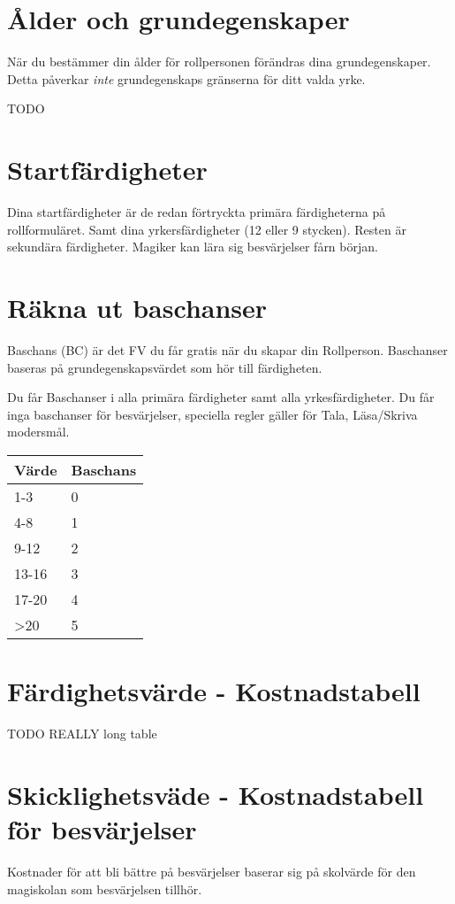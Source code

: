 \documentclass[a4paper, 10pt, titlepage]{article}
\begin{document}
\section{Ålder och grundegenskaper}

När du bestämmer din ålder för rollpersonen förändras dina grundegenskaper. Detta
påverkar \textit{inte}  grundegenskaps gränserna för ditt valda yrke.

TODO

\section{Startfärdigheter}
Dina startfärdigheter är de redan förtryckta primära färdigheterna på rollformuläret.
Samt dina yrkersfärdigheter (12 eller 9 stycken). Resten är sekundära färdigheter.
Magiker kan lära sig besvärjelser fårn början.

\section{Räkna ut baschanser}
Baschans (BC) är det FV du får gratis när du skapar din Rollperson. Baschanser baseras
på grundegenskapsvärdet som hör till färdigheten.

Du får Baschanser i alla primära färdigheter samt alla yrkesfärdigheter.
Du får inga baschanser för besvärjelser, speciella regler gäller för Tala,
Läsa/Skriva modersmål.

\begin{table}[hbp]
  \begin{tabular}{|l|l|}
    \hline
    Värde & Baschans \\
    \hline
    1-3   & 0 \\
    \hline
    4-8   & 1 \\
    \hline
    9-12  & 2 \\
    \hline
    13-16 & 3 \\
    \hline
    17-20 & 4 \\
    \hline
    >20   & 5 \\
    \hline
  \end{tabular}
\end{table}

\section{Färdighetsvärde - Kostnadstabell}
TODO REALLY long table

\section{Skicklighetsväde - Kostnadstabell för besvärjelser}
Kostnader för att bli bättre på besvärjelser baserar sig på skolvärde för den magiskolan
som besvärjelsen tillhör.
\end{document}
